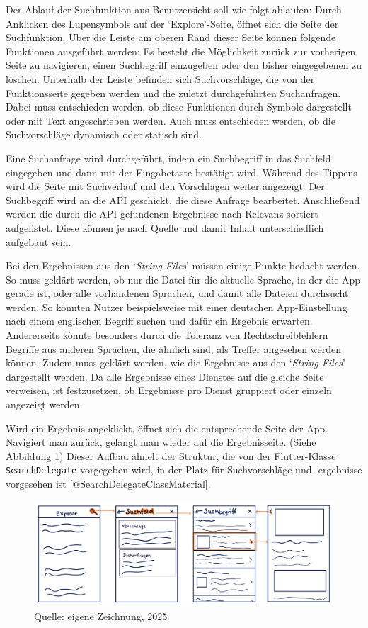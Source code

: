 \documentclass[
  12pt,
  a4paperpaper,
]{report}
\begin{document}
Der Ablauf der Suchfunktion aus Benutzersicht soll wie folgt ablaufen:
Durch Anklicken des Lupensymbols auf der `Explore'-Seite, öffnet sich
die Seite der Suchfunktion. Über die Leiste am oberen Rand dieser Seite
können folgende Funktionen ausgeführt werden: Es besteht die Möglichkeit
zurück zur vorherigen Seite zu navigieren, einen Suchbegriff einzugeben
oder den bisher eingegebenen zu löschen. Unterhalb der Leiste befinden
sich Suchvorschläge, die von der Funktionsseite gegeben werden und die
zuletzt durchgeführten Suchanfragen. Dabei muss entschieden werden, ob
diese Funktionen durch Symbole dargestellt oder mit Text angeschrieben
werden. Auch muss entschieden werden, ob die Suchvorschläge dynamisch
oder statisch sind.

Eine Suchanfrage wird durchgeführt, indem ein Suchbegriff in das
Suchfeld eingegeben und dann mit der Eingabetaste bestätigt wird.
Während des Tippens wird die Seite mit Suchverlauf und den Vorschlägen
weiter angezeigt. Der Suchbegriff wird an die API geschickt, die diese
Anfrage bearbeitet. Anschließend werden die durch die API gefundenen
Ergebnisse nach Relevanz sortiert aufgelistet. Diese können je nach
Quelle und damit Inhalt unterschiedlich aufgebaut sein.

Bei den Ergebnissen aus den `\emph{String-Files}' müssen einige Punkte
bedacht werden. So muss geklärt werden, ob nur die Datei für die
aktuelle Sprache, in der die App gerade ist, oder alle vorhandenen
Sprachen, und damit alle Dateien durchsucht werden. So könnten Nutzer
beispielsweise mit einer deutschen App-Einstellung nach einem englischen
Begriff suchen und dafür ein Ergebnis erwarten. Andererseits könnte
besonders durch die Toleranz von Rechtschreibfehlern Begriffe aus
anderen Sprachen, die ähnlich sind, als Treffer angesehen werden können.
Zudem muss geklärt werden, wie die Ergebnisse aus den
`\emph{String-Files}' dargestellt werden. Da alle Ergebnisse eines
Dienstes auf die gleiche Seite verweisen, ist festzusetzen, ob
Ergebnisse pro Dienst gruppiert oder einzeln angezeigt werden.

Wird ein Ergebnis angeklickt, öffnet sich die entsprechende Seite der
App. Navigiert man zurück, gelangt man wieder auf die Ergebnisseite.
(Siehe Abbildung \ref{fig:wireframe_1}) Dieser Aufbau ähnelt der
Struktur, die von der Flutter-Klasse \texttt{SearchDelegate} vorgegeben
wird, in der Platz für Suchvorschläge und -ergebnisse vorgesehen ist
{[}@SearchDelegateClassMaterial{]}.

\begin{figure}
\centering
\includegraphics[width=1\linewidth,height=\textheight,keepaspectratio]{source/figures/Wireframes_ba_1.png}
\caption{Quelle: eigene Zeichnung, 2025}\label{fig:wireframe_1}
\end{figure}
\end{document}

